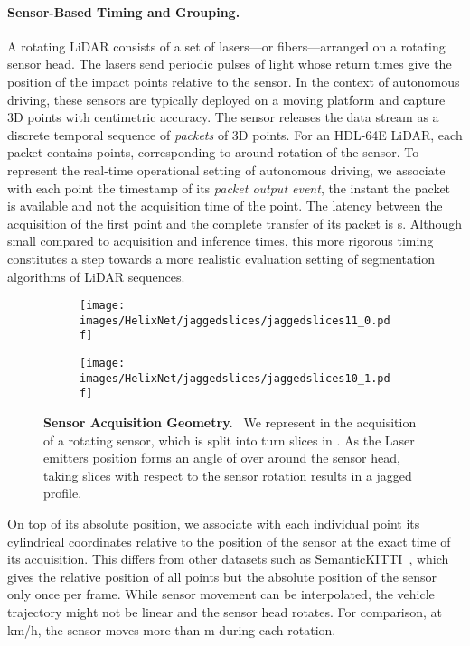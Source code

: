 \documentclass[runningheads]{tpls/llncs}
\begin{document}
\paragraph{Sensor-Based Timing and Grouping.}
A rotating LiDAR consists of a set of lasers---or fibers---arranged on a rotating sensor head. The lasers send periodic pulses of light whose return times give the position of the impact points relative to the sensor. In the context of autonomous driving, these sensors are typically deployed on a moving platform and capture 3D points with centimetric accuracy.
The sensor releases the data stream as a discrete temporal sequence of \emph{packets} of 3D points. For an HDL-64E LiDAR, each packet contains  points,  corresponding to around  rotation of the sensor. To represent the real-time operational setting of autonomous driving, we associate with each point the timestamp of its \emph{packet output event}, \ie the instant the packet is available and not the acquisition time of the point. The latency between the acquisition of the first point and the complete transfer of its packet is s. Although small compared to acquisition and inference times, this more rigorous timing constitutes a step towards a more realistic evaluation setting of segmentation algorithms of LiDAR sequences. 

\begin{figure}[t]
    \centering
    \begin{subfigure}[b]{0.495\textwidth}
            \texttt{[image: images/HelixNet/jaggedslices/jaggedslices11\_0.pdf]}
        \label{fig:sub:theta}
    \end{subfigure}
    \hfill
    \begin{subfigure}[b]{0.495\textwidth}
            \texttt{[image: images/HelixNet/jaggedslices/jaggedslices10\_1.pdf]}
        \label{fig:sub:slices}
    \end{subfigure}
    \caption{\textbf{Sensor Acquisition Geometry.}~
    We represent in  the acquisition of a rotating sensor, which is split into  turn slices in . 
    As the Laser emitters position forms an angle of over  around the sensor head, taking slices with respect to the sensor rotation  results in a jagged profile.
    }
    \label{fig:jaggedslices}
\end{figure}

On top of its absolute position, we associate with each individual point its cylindrical coordinates relative to the position of the sensor at the exact time of its acquisition. This differs from other datasets such as SemanticKITTI~\cite{behley2019iccv}, which gives the relative position of all points but the absolute position of the sensor only once per frame. While sensor movement can be interpolated, the vehicle trajectory might not be linear and the sensor head rotates. For comparison, at km/h, the sensor moves more than m during each rotation.
\end{document}
